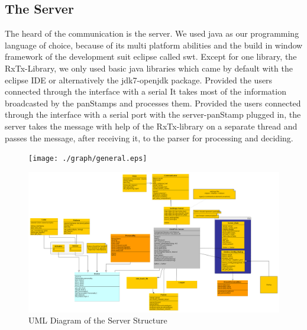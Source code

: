 \subsection{The Server}
The heard of the communication is the server. We used java\cite{java} as our programming language of choice, because of its multi platform abilities and the build in window framework of the development suit eclipse\cite{eclipse} called swt\cite{swt}. Except for one library, the RxTx-Library\cite{rxtx}, we only used basic java libraries which came by default with the eclipse IDE\cite{ide}  or alternatively the jdk7-openjdk\cite{open_jdk} package.
Provided the users connected through the interface with a serial It takes most of the information broadcasted by the panStamps\cite{panstamp} and processes them.
Provided the users connected through the interface with a serial port with the server-panStamp plugged in, the server takes the message with help of the RxTx-library\cite{rxtx} on a separate thread and passes the message, after receiving it, to the parser for processing and deciding.

\begin{figure}[ht]
\centering
\texttt{[image: ./graph/general.eps]}
\end{figure}
\begin{figure}[ht]
	\centerline{\includegraphics[width=\textwidth]{./graph/general.png}}
	\caption{UML Diagram of the Server Structure}
	\label{fig:server_uml}
\end{figure}
